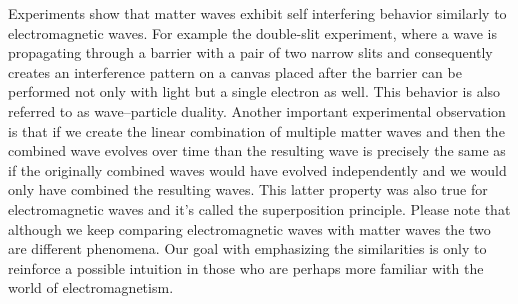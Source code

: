 Experiments show that matter waves exhibit self interfering behavior similarly to electromagnetic waves.
For example the double-slit experiment, where a wave is propagating through a barrier with a pair of two narrow slits and consequently creates an interference pattern on a canvas placed after the barrier can be performed not only with light but a single electron as well.
This behavior is also referred to as wave–particle duality.
Another important experimental observation is that if we create the linear combination of multiple matter waves and then the combined wave evolves over time than the resulting wave is precisely the same as if the originally combined waves would have evolved independently and we would only have combined the resulting waves.
This latter property was also true for electromagnetic waves and it's called the superposition principle.
Please note that although we keep comparing electromagnetic waves with matter waves the two are different phenomena.
Our goal with emphasizing the similarities is only to reinforce a possible intuition in those who are perhaps more familiar with the world of electromagnetism.

